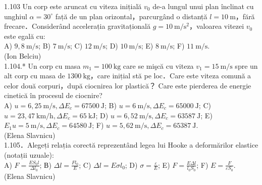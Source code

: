 \documentclass[10pt]{article}
\begin{document}
1.103 Un corp este aruncat cu viteza inițială $v_{0}$ de-a lungul unui plan înclinat cu unghiul $\alpha=30^{\circ}$ față de un plan orizontal，parcurgând o distanță $l=10 \mathrm{~m}$，fără frecare．Considerând accelerația gravitațională $g=10 \mathrm{~m} / \mathrm{s}^{2}$，valoarea vitezei $v_{0}$ este egală cu:\\ A) $9,8 \mathrm{~m} / \mathrm{s}$; B) $7 \mathrm{~m} / \mathrm{s}$; C) $12 \mathrm{~m} / \mathrm{s}$; D) $10 \mathrm{~m} / \mathrm{s}$; E) $8 \mathrm{~m} / \mathrm{s}$; F) $11 \mathrm{~m} / \mathrm{s}$.\\ (Ion Belciu)\\

1.104.* Un corp cu masa $m_{1}=100 \mathrm{~kg}$ care se mişcă cu viteza $v_{1}=15 \mathrm{~m} / \mathrm{s}$ spre un alt corp cu masa de $1300 \mathrm{~kg}$，care inițial stă pe loc．Care este viteza comună a celor două corpuri，după ciocnirea lor plastică？ Care este pierderea de energie cinetică în procesul de ciocnire?\\ A) $u=6,25 \mathrm{~m} / \mathrm{s}, \Delta E_{c}=67500 \mathrm{~J}$; B) $u=6 \mathrm{~m} / \mathrm{s}, \Delta E_{c}=65000 \mathrm{~J}$; C) $u=23,47 \mathrm{~km} / \mathrm{h}, \Delta E_{c}=65 \mathrm{~kJ}$; D) $u=6,52 \mathrm{~m} / \mathrm{s}, \Delta E_{c}=63587 \mathrm{~J}$; E) $E_{1} u=5 \mathrm{~m} / \mathrm{s}, \Delta E_{c}=64580 \mathrm{~J}$; F) $u=5,62 \mathrm{~m} / \mathrm{s}, \Delta E_{c}=65387 \mathrm{~J}$.\\ (Elena Slavnicu)\\

1.105．Alegeți relația corectă reprezentând legea lui Hooke a deformărilor elastice (notații uzuale):\\ A) $F=\frac{E S_{0} l}{\Delta l_{0}}$; В) $\Delta l=\frac{F l_{0}}{E}$; C) $\Delta l=E \sigma l_{0}$; D) $\sigma=\frac{\varepsilon}{E}$; E) $F=\frac{E \Delta l}{l_{0} S_{0}}$; F) $E=\frac{F}{\varepsilon S_{0}}$.\\ (Elena Slavnicu)\\
\end{document}

